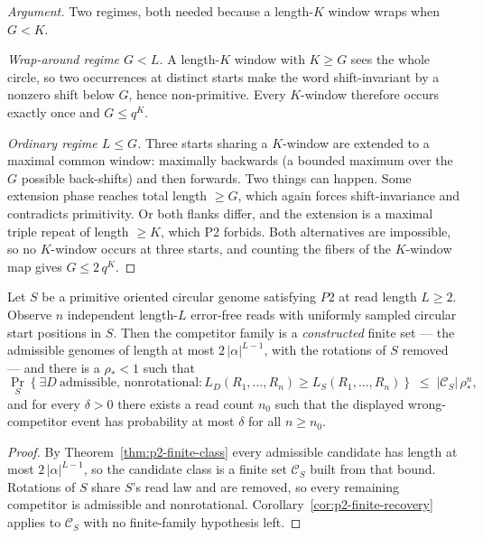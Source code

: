 \begin{proof}[Argument]
Two regimes, both needed because a length-$K$ window wraps when $G<K$.

\emph{Wrap-around regime $G<L$.}  A length-$K$ window with $K\ge G$ sees the
whole circle, so two occurrences at distinct starts make the word
shift-invariant by a nonzero shift below $G$, hence non-primitive.  Every
$K$-window therefore occurs exactly once and $G\le q^{K}$.

\emph{Ordinary regime $L\le G$.}  Three starts sharing a $K$-window are
extended to a maximal common window: maximally backwards (a bounded maximum
over the $G$ possible back-shifts) and then forwards.  Two things can
happen.  Some extension phase reaches total length $\ge G$, which again
forces shift-invariance and contradicts primitivity.  Or both flanks
differ, and the extension is a maximal triple repeat of length $\ge K$,
which P2 forbids.  Both alternatives are impossible, so no $K$-window occurs
at three starts, and counting the fibers of the $K$-window map gives
$G\le2\,q^{K}$.
\end{proof}



\begin{corollary}
\label{cor:p2-finite-recovery-all}
Let $S$ be a primitive oriented circular genome satisfying $P2$ at read
length $L\ge2$.  Observe $n$ independent length-$L$ error-free reads with
uniformly sampled circular start positions in $S$.  Then the competitor
family is a \emph{constructed} finite set --- the admissible genomes of
length at most $2\,|\alpha|^{L-1}$, with the rotations of $S$ removed --- and
there is a $\rho_*<1$ such that
\[
 \Pr_S\!\left\{\exists D\ \text{admissible, nonrotational}:
       L_D(R_1,\dots,R_n)\ge L_S(R_1,\dots,R_n)\right\}
 \;\le\;|\mathcal C_S|\,\rho_*^{n},
\]
and for every $\delta>0$ there exists a read count $n_0$ such that the displayed
wrong-competitor event has probability at most $\delta$ for all $n\ge n_0$.
\end{corollary}

\begin{proof}
By Theorem~\ref{thm:p2-finite-class} every admissible candidate has length at
most $2\,|\alpha|^{L-1}$, so the candidate class is a finite set
$\mathcal C_S$ built from that bound.  Rotations of $S$ share $S$'s read law
and are removed, so every remaining competitor is admissible and
nonrotational.  Corollary~\ref{cor:p2-finite-recovery} applies to
$\mathcal C_S$ with no finite-family hypothesis left.
\end{proof}



